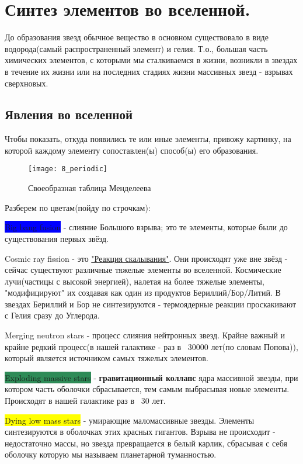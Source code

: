 
\section{ Синтез элементов во вселенной.}

До образования звезд обычное вещество в основном существовало в виде водорода(самый распространенный элемент) и гелия. Т.о., большая часть химических элементов, с которыми мы сталкиваемся в жизни, возникли в звездах в течение их жизни или на последних стадиях жизни массивных звезд - взрывах сверхновых.

\subsection{Явления во вселенной}

Чтобы показать, откуда появились те или иные элементы, привожу картинку, на которой каждому элементу сопоставлен(ы) способ(ы) его образования.

\begin{figure}[H]
	\centering
	\texttt{[image: 8\_periodic]}
	\caption{Своеобразная таблица Менделеева}
	\label{fig:8_periodic}
\end{figure}

Разберем по цветам(пойду по строчкам):

\colorbox{Blue}{Big bang fusion} - слияние Большого взрыва; это те элементы, которые были до существования первых звёзд.

\colorbox{CarnationPink}{Cosmic ray fission} - это \href{https://en.wikipedia.org/wiki/Cosmic_ray_spallation}{"Реакция скалывания"}. Они происходят уже вне звёзд - сейчас существуют различные тяжелые элементы во вселенной. Космические лучи(частицы с высокой энергией), налетая на более тяжелые элементы, "модифицируют" их создавая как один из продуктов Бериллий/Бор/Литий. В звездах Бериллий и Бор не синтезируются - термоядерные реакции проскакивают с Гелия сразу до Углерода.

\colorbox{BurntOrange}{Merging neutron stars} - процесс слияния нейтронных звезд. Крайне важный и крайне редкий процесс(в нашей галактике - раз в ~30000 лет(по словам Попова)), который является источником самых тяжелых элементов.

\colorbox{SeaGreen}{Exploding massive stars} - \textbf{гравитационный коллапс} ядра массивной звезды, при котором часть оболочки сбрасывается, тем самым выбрасывая новые элементы. Происходят в нашей галактике раз в ~30 лет.

\colorbox{Yellow}{Dying low mass stars} - умирающие маломассивные звезды. Элементы синтезируются в оболочках этих красных гигантов. Взрыва не происходит - недостаточно массы, но звезда превращается в белый карлик, сбрасывая с себя оболочку которую мы называем планетарной туманностью.

